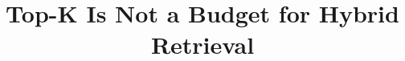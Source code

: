 \documentclass[10pt,letterpaper]{article}
\title{Top-K Is Not a Budget for Hybrid Retrieval}
\begin{document}
\raggedbottom
\maketitle
\begin{abstract}

\end{abstract}
\begin{keywords}

\end{keywords}





\clearpage


\end{document}
